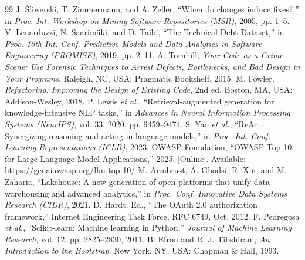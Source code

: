 \documentclass[conference]{IEEEtran}
\begin{document}
\begin{thebibliography}{99}
 J. \'Sliwerski, T. Zimmermann, and A. Zeller, ``When do changes induce fixes?,'' in \textit{Proc. Int. Workshop on Mining Software Repositories (MSR)}, 2005, pp. 1--5.
 V. Lenarduzzi, N. Saarim\"aki, and D. Taibi, ``The Technical Debt Dataset,'' in \textit{Proc. 15th Int. Conf. Predictive Models and Data Analytics in Software Engineering (PROMISE)}, 2019, pp. 2--11.
 A. Tornhill, \textit{Your Code as a Crime Scene: Use Forensic Techniques to Arrest Defects, Bottlenecks, and Bad Design in Your Programs}. Raleigh, NC, USA: Pragmatic Bookshelf, 2015.
 M. Fowler, \textit{Refactoring: Improving the Design of Existing Code}, 2nd ed. Boston, MA, USA: Addison-Wesley, 2018.
 P. Lewis \textit{et al.}, ``Retrieval-augmented generation for knowledge-intensive NLP tasks,'' in \textit{Advances in Neural Information Processing Systems (NeurIPS)}, vol. 33, 2020, pp. 9459--9474.
 S. Yao \textit{et al.}, ``ReAct: Synergizing reasoning and acting in language models,'' in \textit{Proc. Int. Conf. Learning Representations (ICLR)}, 2023.
 OWASP Foundation, ``OWASP Top 10 for Large Language Model Applications,'' 2025. [Online]. Available: \url{https://genai.owasp.org/llm-top-10/}
 M. Armbrust, A. Ghodsi, R. Xin, and M. Zaharia, ``Lakehouse: A new generation of open platforms that unify data warehousing and advanced analytics,'' in \textit{Proc. Conf. Innovative Data Systems Research (CIDR)}, 2021.
 D. Hardt, Ed., ``The OAuth 2.0 authorization framework,'' Internet Engineering Task Force, RFC 6749, Oct. 2012.
 F. Pedregosa \textit{et al.}, ``Scikit-learn: Machine learning in Python,'' \textit{Journal of Machine Learning Research}, vol. 12, pp. 2825--2830, 2011.
 B. Efron and R. J. Tibshirani, \textit{An Introduction to the Bootstrap}. New York, NY, USA: Chapman \& Hall, 1993.
\end{thebibliography}
\end{document}
